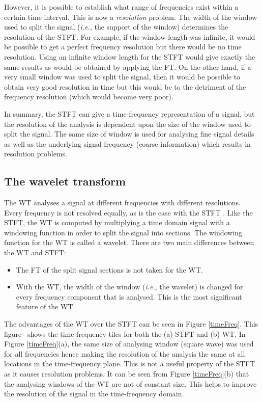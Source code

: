 \documentclass[12pt]{report}
\begin{document}
However, it is possible to establish what range of frequencies exist within a certain time interval.
This is now a \emph{resolution} problem. The width of the window used to split the signal (\emph{i.e.}, the
support of the window) determines the resolution of the STFT. For example, if the window length was
infinite, it would be possible to get a perfect frequency resolution but there would
be no time resolution. Using an infinite window length for the STFT 
would give exactly the same results as would be obtained by applying the FT. 
On the other hand, if a very small window was used to split the
signal, then it would be possible to obtain very good resolution in time but this would be to the detriment of the frequency resolution (which 
would become very poor).

In summary, the STFT can give a time-frequency representation of a signal, but the resolution of the analysis
is dependent upon the size of the window used to split the signal. The same size of window is used 
for analysing fine signal details as well as the underlying signal frequency (coarse information) which results in resolution 
problems.

\subsection{The wavelet transform}
The WT analyses a signal at different frequencies with different resolutions.
Every frequency is not resolved equally, as is the case with the STFT \cite{robi}.
Like the STFT, the WT is computed by multiplying a time domain signal with a windowing function
in order to split the signal into sections. The windowing function for the WT is called a wavelet.
There are two main differences between the WT and STFT:
\begin{itemize}
	\item The FT of the split signal sections is not taken for the WT.
	\item With the WT, the width of the window (\emph{i.e.}, the wavelet) is changed for every 
	frequency component that is analysed. This is the most significant feature of the
	WT.
\end{itemize}


The advantages of the WT over the STFT can be seen in Figure \ref{timeFreq}. This figure~\cite{graps} shows
the time-frequency tiles for both the (a) STFT and (b) WT.
In Figure \ref{timeFreq}(a), the same size of analysing window (square wave) was used for all frequencies 
hence making the
resolution of the analysis the same at all locations in the time-frequency plane.
This is not a useful property of the STFT as it causes resolution problems. 
It can be seen from Figure \ref{timeFreq}(b) that the analysing windows of the WT are not of constant
size. This helps to improve the resolution of the signal in the time-frequency domain.
\end{document}
